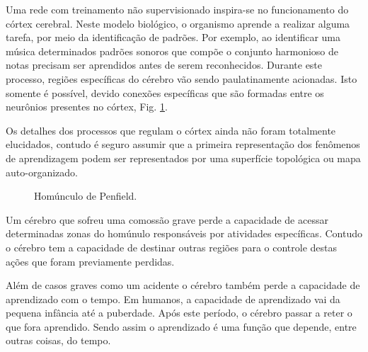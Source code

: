 Uma rede com treinamento não supervisionado inspira-se no funcionamento do córtex cerebral. Neste modelo biológico, o organismo aprende a realizar alguma tarefa, por meio da identificação de padrões. Por exemplo, ao identificar uma música determinados padrões sonoros que compõe o conjunto harmonioso de notas precisam ser aprendidos antes de serem reconhecidos. Durante este processo, regiões específicas do cérebro vão sendo paulatinamente acionadas. Isto somente é possível, devido conexões específicas que são formadas entre os neurônios
presentes no córtex, Fig. \ref{homunculo}.

Os detalhes dos processos que regulam o córtex ainda não foram totalmente elucidados, contudo é seguro assumir que a primeira representação dos fenômenos de aprendizagem podem ser representados por uma superfície topológica ou mapa auto-organizado. 

\begin{figure}[H]
	\centering
	\setlength{\fboxsep}{8pt}
	\setlength{\fboxrule}{0.1pt}
	\caption{Homúnculo de Penfield.}
	\label{homunculo}
\end{figure}

Um cérebro que sofreu uma comossão grave perde a capacidade de acessar
determinadas zonas do homúnulo responsáveis por atividades específicas. Contudo
o cérebro tem a capacidade de destinar outras regiões para o controle destas
ações que foram previamente perdidas.

Além de casos graves como um acidente o cérebro também perde a capacidade de
aprendizado com o tempo. Em humanos, a capacidade de aprendizado vai da pequena
infância até a puberdade. Após este período, o cérebro passar a reter o que fora
aprendido. Sendo assim o aprendizado é uma função que depende, entre outras
coisas, do tempo.
